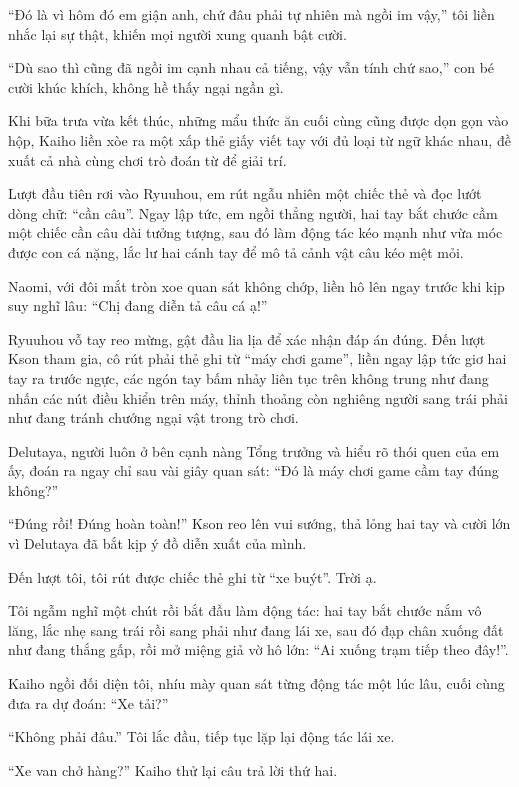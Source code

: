 ﻿\documentclass[../main.tex]{subfiles}
\begin{document}
``Đó là vì hôm đó em giận anh, chứ đâu phải tự nhiên mà ngồi im vậy,'' tôi liền nhắc lại sự thật, khiến mọi người xung quanh bật cười.

``Dù sao thì cũng đã ngồi im cạnh nhau cả tiếng, vậy vẫn tính chứ sao,'' con bé cười khúc khích, không hề thấy ngại ngần gì.

\ct

Khi bữa trưa vừa kết thúc, những mẩu thức ăn cuối cùng cũng được dọn gọn vào hộp, Kaiho liền xòe ra một xấp thẻ giấy viết tay với đủ loại từ ngữ khác nhau, đề xuất cả nhà cùng chơi trò đoán từ để giải trí.

Lượt đầu tiên rơi vào Ryuuhou, em rút ngẫu nhiên một chiếc thẻ và đọc lướt dòng chữ: ``cần câu''. Ngay lập tức, em ngồi thẳng người, hai tay bắt chước cầm một chiếc cần câu dài tưởng tượng, sau đó làm động tác kéo mạnh như vừa móc được con cá nặng, lắc lư hai cánh tay để mô tả cảnh vật câu kéo mệt mỏi.

Naomi, với đôi mắt tròn xoe quan sát không chớp, liền hô lên ngay trước khi kịp suy nghĩ lâu: ``Chị đang diễn tả câu cá ạ!''

Ryuuhou vỗ tay reo mừng, gật đầu lia lịa để xác nhận đáp án đúng. Đến lượt Kson tham gia, cô rút phải thẻ ghi từ ``máy chơi game'', liền ngay lập tức giơ hai tay ra trước ngực, các ngón tay bấm nhảy liên tục trên không trung như đang nhấn các nút điều khiển trên máy, thỉnh thoảng còn nghiêng người sang trái phải như đang tránh chướng ngại vật trong trò chơi.

Delutaya, người luôn ở bên cạnh nàng Tổng trưởng và hiểu rõ thói quen của em ấy, đoán ra ngay chỉ sau vài giây quan sát: ``Đó là máy chơi game cầm tay đúng không?''

``Đúng rồi! Đúng hoàn toàn!'' Kson reo lên vui sướng, thả lỏng hai tay và cười lớn vì Delutaya đã bắt kịp ý đồ diễn xuất của mình.

Đến lượt tôi, tôi rút được chiếc thẻ ghi từ ``xe buýt''. Trời ạ.

Tôi ngẫm nghĩ một chút rồi bắt đầu làm động tác: hai tay bắt chước nắm vô lăng, lắc nhẹ sang trái rồi sang phải như đang lái xe, sau đó đạp chân xuống đất như đang thắng gấp, rồi mở miệng giả vờ hô lớn: ``Ai xuống trạm tiếp theo đây!''.

Kaiho ngồi đối diện tôi, nhíu mày quan sát từng động tác một lúc lâu, cuối cùng đưa ra dự đoán: ``Xe tải?''

``Không phải đâu.'' Tôi lắc đầu, tiếp tục lặp lại động tác lái xe.

``Xe van chở hàng?'' Kaiho thử lại câu trả lời thứ hai.
\end{document}

